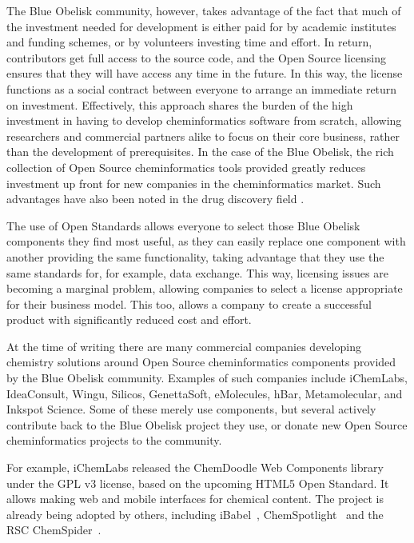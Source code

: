 \documentclass[10pt]{bmc_article}
\newenvironment{bmcformat}{\begin{raggedright}\baselineskip20pt\sloppy\setboolean{publ}{false}}{\end{raggedright}\baselineskip20pt\sloppy}
\begin{document}
\begin{bmcformat}
The Blue Obelisk community, however, takes advantage of the fact that much of the investment needed
for development is either paid for by academic institutes and funding
schemes, or by
volunteers investing time and effort. In return, contributors get full
access to the source code, and the Open Source licensing ensures
that they will have access any time in the future. In this way, the
license functions as a social
contract between everyone to arrange an immediate return on investment. Effectively,
this approach shares the burden of the high investment in having to develop cheminformatics
software from scratch, allowing researchers and commercial partners alike to focus
on their core business, rather than the development of prerequisites.
In the case of the Blue Obelisk, the rich
collection of Open Source cheminformatics tools provided
greatly reduces investment up front for new companies in the
cheminformatics market. Such advantages have also been noted in the
drug discovery
field \cite{DeLano:2005uq, Munos:2006vn, Geldenhuys:2006kx}.

The use of Open Standards allows everyone to select those Blue Obelisk components
they find most useful, as they can easily replace one component with another providing
the same functionality, taking advantage that they use the same standards for,
for example, data exchange. This way, licensing issues are becoming a marginal
problem, allowing companies to select a license appropriate for their business
model. This too, allows a company to create a successful product with significantly
reduced cost and effort.

At the time of writing there are many commercial companies developing chemistry
solutions around Open Source cheminformatics components provided by the Blue Obelisk
community. Examples of such companies include iChemLabs, IdeaConsult, Wingu, Silicos,
GenettaSoft, eMolecules, hBar, Metamolecular, and Inkspot Science. Some of these merely use components, but several
actively contribute back to the Blue Obelisk project they use, or donate new
Open Source cheminformatics projects to the community.

For example, iChemLabs released the ChemDoodle Web Components library under the GPL v3
license, based on the upcoming HTML5 Open Standard. It allows making web and mobile
interfaces for chemical content. The project is already being adopted by others,
including iBabel~\cite{iBabel}, ChemSpotlight~\cite{chemspotlight} and the RSC ChemSpider~\cite{chemspider,chemspider_chemdoodle}.


\end{bmcformat}
\end{document}
